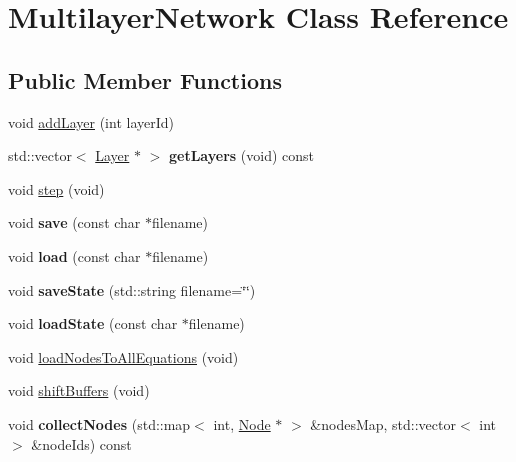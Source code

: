 \hypertarget{classMultilayerNetwork}{}\section{Multilayer\+Network Class Reference}
\label{classMultilayerNetwork}
\subsection*{Public Member Functions}
\begin{DoxyCompactItemize}
\item 
void \hyperlink{classMultilayerNetwork_a229198446718a0bf87d872ea04f5308a}{add\+Layer} (int layer\+Id)
\item 
std\+::vector$<$ \hyperlink{classLayer}{Layer} $\ast$ $>$ {\bfseries get\+Layers} (void) const \hypertarget{classMultilayerNetwork_ad4ec3500f8c0b436ba738dcd5b533ba6}{}\label{classMultilayerNetwork_ad4ec3500f8c0b436ba738dcd5b533ba6}

\item 
void \hyperlink{classMultilayerNetwork_a8b52de3dbb17a23b7c86708ad53ba161}{step} (void)
\item 
void {\bfseries save} (const char $\ast$filename)\hypertarget{classMultilayerNetwork_ad5e402faebd6fb5b44616f549286757b}{}\label{classMultilayerNetwork_ad5e402faebd6fb5b44616f549286757b}

\item 
void {\bfseries load} (const char $\ast$filename)\hypertarget{classMultilayerNetwork_a6649a568665867114ddebe7b4b0726f7}{}\label{classMultilayerNetwork_a6649a568665867114ddebe7b4b0726f7}

\item 
void {\bfseries save\+State} (std\+::string filename=\char`\"{}\char`\"{})\hypertarget{classMultilayerNetwork_a4723e9478fe2a78bcf35a540869d66a4}{}\label{classMultilayerNetwork_a4723e9478fe2a78bcf35a540869d66a4}

\item 
void {\bfseries load\+State} (const char $\ast$filename)\hypertarget{classMultilayerNetwork_a2536024138714e0ddc51bb4b1ae79395}{}\label{classMultilayerNetwork_a2536024138714e0ddc51bb4b1ae79395}

\item 
void \hyperlink{classMultilayerNetwork_ab21e50242eea4221aab415e5b2a5a326}{load\+Nodes\+To\+All\+Equations} (void)
\item 
void \hyperlink{classMultilayerNetwork_a1d00f683f9d07fc715b8c2e4786884c8}{shift\+Buffers} (void)
\item 
void {\bfseries collect\+Nodes} (std\+::map$<$ int, \hyperlink{classNode}{Node} $\ast$ $>$ \&nodes\+Map, std\+::vector$<$ int $>$ \&node\+Ids) const \hypertarget{classMultilayerNetwork_a336346cc9479828006fed64ce4f204e8}{}\label{classMultilayerNetwork_a336346cc9479828006fed64ce4f204e8}


\end{DoxyCompactItemize}
